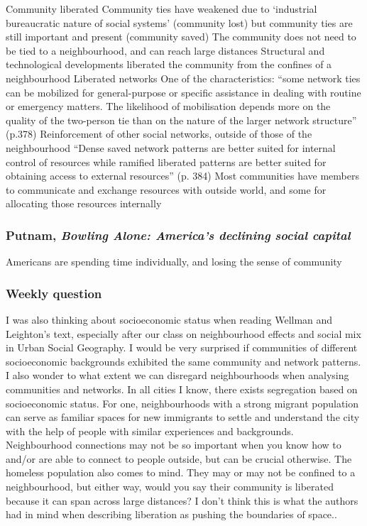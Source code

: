 \documentclass{article}
\begin{document}
\begin{outline}
	\1 Community liberated
		\2 Community ties have weakened due to `industrial bureaucratic nature of social systems' (community lost) but community ties are still important and present (community saved)
		\2 The community does not need to be tied to a neighbourhood, and can reach large distances
		\2 Structural and technological developments liberated the community from the confines of a neighbourhood
	\1 Liberated networks
		\2 One of the characteristics: ``some network ties can be mobilized for general-purpose or specific assistance in dealing with routine or emergency matters. The likelihood of mobilisation depends more on the quality of the two-person tie than on the nature of the larger network structure'' (p.378)
		\2 Reinforcement of other social networks, outside of those of the neighbourhood
	\1 ``Dense saved network patterns are better suited for internal control of resources while ramified liberated patterns are better suited for obtaining access to external resources'' (p. 384)
	\1 Most communities have members to communicate and exchange resources with outside world, and some for allocating those resources internally 
\end{outline}

\subsubsection{Putnam, \textit{Bowling Alone: America's declining social capital}}

\begin{outline}
	\1 Americans are spending time individually, and losing the sense of community 
\end{outline}

\subsubsection{Weekly question}

\begin{outline}
	\1 I was also thinking about socioeconomic status when reading Wellman and Leighton's text, especially after our class on neighbourhood effects and social mix in Urban Social Geography. I would be very surprised if communities of different socioeconomic backgrounds exhibited the same community and network patterns. I also wonder to what extent we can disregard neighbourhoods when analysing communities and networks. In all cities I know, there exists segregation based on socioeconomic status.
For one, neighbourhoods with a strong migrant population can serve as familiar spaces for new immigrants to settle and understand the city with the help of people with similar experiences and backgrounds. Neighbourhood connections may not be so important when you know how to and/or are able to connect to people outside, but can be crucial otherwise.
The homeless population also comes to mind. They may or may not be confined to a neighbourhood, but either way, would you say their community is liberated because it can span across large distances? I don't think this is what the authors had in mind when describing liberation as pushing the boundaries of space..
\end{outline}
\end{document}

